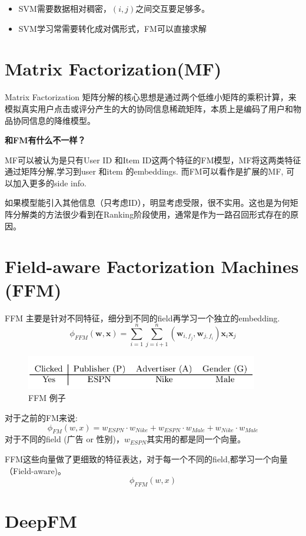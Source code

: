 \documentclass{article}
\begin{document}
\begin{CJK*}{UTF8}{gbsn}
\begin{itemize}
\item SVM需要数据相对稠密，$(i,j)$之间交互要足够多。
\item SVM学习常需要转化成对偶形式，FM可以直接求解
\end{itemize}

\section{Matrix Factorization(MF)}
Matrix Factorization 矩阵分解的核心思想是通过两个低维小矩阵的乘积计算，来模拟真实用户点击或评分产生的大的协同信息稀疏矩阵，本质上是编码了用户和物品协同信息的降维模型。

\noindent
\textbf{和FM有什么不一样？}

MF可以被认为是只有User ID 和Item ID这两个特征的FM模型，MF将这两类特征通过矩阵分解,学习到user 和item 的embeddings. 而FM可以看作是扩展的MF, 可以加入更多的side info. 

如果模型能引入其他信息（只考虑ID），明显考虑受限，很不实用。这也是为何矩阵分解类的方法很少看到在Ranking阶段使用，通常是作为一路召回形式存在的原因。
\section{Field-aware Factorization Machines (FFM)}
FFM \cite{DBLP:conf/recsys/JuanZCL16} 主要是针对不同特征，细分到不同的field再学习一个独立的embedding.
$$\phi_{FFM}(\textbf{w},\textbf{x})=\sum_{i=1}^{n} \sum_{j=i+1}^{n}(\textbf{w}_{i,f_{j}},\textbf{w}_{j,f_{i}})\textbf{x}_{i} \textbf{x}_{j}$$

\begin{figure}[H]
\centering
\includegraphics[width=4in,height=0.6in]{ffm1}
\caption{FFM 例子}
\end{figure}
对于之前的FM来说:
$$\phi_{FM}(w,x)=w_{ESPN}\cdot w_{Nike}+w_{ESPN}\cdot w_{Male}+w_{Nike}\cdot w_{Male}$$
对于不同的field (广告 or 性别)，$w_{ESPN}$其实用的都是同一个向量。

FFM这些向量做了更细致的特征表达，对于每一个不同的field,都学习一个向量（Field-aware)。
$$\phi_{FFM}(w,x)$$

\section{DeepFM}

\end{CJK*}
\end{document}
